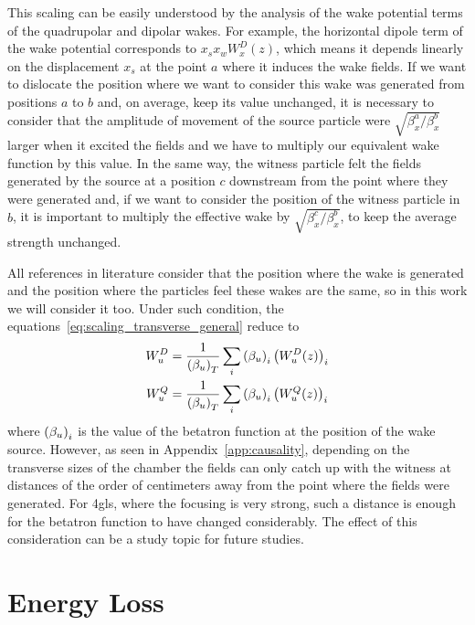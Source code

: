     This scaling can be easily understood by the analysis of the wake potential terms of the quadrupolar and dipolar wakes. For example, the horizontal dipole term of the wake potential corresponds to $x_sx_wW_x^D(z)$, which means it depends linearly on the displacement $x_s$ at the point $a$ where it induces the wake fields. If we want to dislocate the position where we want to consider this wake was generated from positions $a$ to $b$ and, on average, keep its value unchanged, it is necessary to consider that the amplitude of movement of the source particle were $\sqrt{\beta_x^a/\beta_x^b}$ larger when it excited the fields and we have to multiply our equivalent wake function by this value. In the same way, the witness particle felt the fields generated by the source at a position $c$ downstream from the point where they were generated and, if we want to consider the position of the witness particle in $b$, it is important to multiply the effective wake by $\sqrt{\beta_x^c/\beta_x^b}$, to keep the average strength unchanged.

    All references in literature consider that the position where the wake is generated and the position where the particles feel these wakes are the same, so in this work we will consider it too. Under such condition, the equations~\eqref{eq:scaling_transverse_general} reduce to
    \begin{align}\label{eq:scaling_transverse_general}\nonumber
        W_u^D &=\frac{1}{\left(\beta_u\right)_T} \sum_i \left(\beta_u\right)_i\left(W_u^D(z)\right)_i \\
        W_u^Q &=\frac{1}{\left(\beta_u\right)_T} \sum_i \left(\beta_u\right)_i\left(W_u^Q(z)\right)_i
    \end{align}
    where $\left(\beta_u\right)_i$ is the value of the betatron function at the position of the wake source. However, as seen in Appendix~\ref{app:causality}, depending on the transverse sizes of the chamber the fields can only catch up with the witness at distances of the order of centimeters away from the point where the fields were generated. For \gls{4gls}, where the focusing is very strong, such a distance is enough for the betatron function to have changed considerably. The effect of this consideration can be a study topic for future studies.

\section{Energy Loss}\label{sec:energy_loss}

